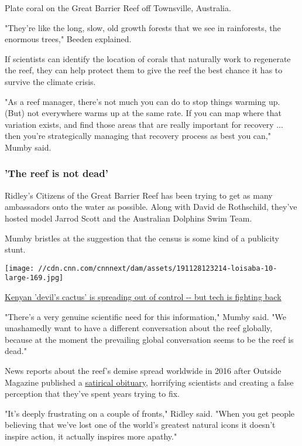 Plate coral on the Great Barrier Reef off Townsville, Australia.

"They're like the long, slow, old growth forests that we see in
rainforests, the enormous trees," Beeden explained.

If scientists can identify the location of corals that naturally work to
regenerate the reef, they can help protect them to give the reef the
best chance it has to survive the climate crisis.

"As a reef manager, there's not much you can do to stop things warming
up. (But) not everywhere warms up at the same rate. If you can map where
that variation exists, and find those areas that are really important
for recovery ... then you're strategically managing that recovery
process as best you can," Mumby said.

\hypertarget{the-reef-is-not-dead}{%
\subsubsection{'The reef is not dead'}\label{the-reef-is-not-dead}}

Ridley's Citizens of the Great Barrier Reef has been trying to get as
many ambassadors onto the water as possible. Along with David de
Rothschild, they've hosted model Jarrod Scott and the Australian
Dolphins Swim Team.

Mumby bristles at the suggestion that the census is some kind of a
publicity stunt.

\href{/2019/12/09/africa/kenya-devil-cactus-intl/index.html}{}

\texttt{[image: //cdn.cnn.com/cnnnext/dam/assets/191128123214-loisaba-10-large-169.jpg]}

\href{/2019/12/09/africa/kenya-devil-cactus-intl/index.html}{Kenyan
'devil's cactus' is spreading out of control -\/- but tech is fighting
back}

"There's a very genuine scientific need for this information," Mumby
said. "We unashamedly want to have a different conversation about the
reef globally, because at the moment the prevailing global conversation
seems to be the reef is dead."

News reports about the reef's demise spread worldwide in 2016 after
Outside Magazine published a
\href{https://edition.cnn.com/2016/10/14/us/barrier-reef-obit-trnd/index.html}{satirical
obituary}, horrifying scientists and creating a false perception that
they've spent years trying to fix.

"It's deeply frustrating on a couple of fronts," Ridley said. "When you
get people believing that we've lost one of the world's greatest natural
icons it doesn't inspire action, it actually inspires more apathy."

